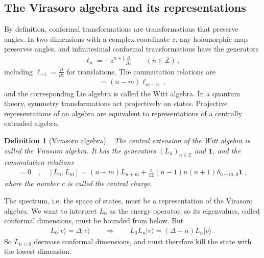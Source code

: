 \documentclass[12pt, a4paper]{article}
\theoremstyle{break}
\newtheorem{defn}[exo]{Definition}
\begin{document}
\subsection{The Virasoro algebra and its representations}

By definition, conformal transformations are transformations that preserve angles. 
In two dimensions with a complex coordinate $z$, any holomorphic map preserves angles, and 
infinitesimal conformal transformations have the generators
\begin{align}
 \ell_n = -z^{n+1}\frac{\partial}{\partial z}\qquad (n\in\mathbb{Z})\ ,
\end{align}
including $\ell_{-1}=\frac{\partial}{\partial z}$ for translations.
The  commutation relations are
\begin{align}
 [\ell_n,\ell_m ] = (n-m)\ell_{m+n}\ ,
\end{align}
and the corresponding Lie algebra is called the Witt algebra.
In a quantum theory, symmetry transformations act projectively on states. 
Projective representations of an algebra are equivalent to representations of a centrally extended algebra. 

\begin{defn}[Virasoro algebra]
 ~\label{def:vir}
 The central extension of the Witt algebra is called the Virasoro algebra. It has the generators $(L_n)_{n\in\mathbb{Z}}$ and $\mathbf 1$, and the commutation relations
 \begin{align}
  [\mathbf 1, L_n] = 0 \quad , \quad [L_n,L_m] = (n-m)L_{n+m} +\frac{c}{12}(n-1)n(n+1)\delta_{n+m,0}\mathbf 1 \ ,
  \label{eq:vir}
 \end{align}
 where the number $c$ is called the central charge. 
\end{defn}

The spectrum, i.e. the space of states, must be a representation of the Virasoro algebra.
We want to interpret $L_0$ as the energy operator, so its eigenvalues, called conformal dimensions, must be bounded from below. But 
\begin{align}
 L_0 |v\rangle = \Delta |v\rangle  \qquad \Rightarrow \qquad L_0 L_n|v\rangle =  (\Delta-n)L_n|v\rangle \ .
\end{align}
So $L_{n>0}$ decrease conformal dimensions, and must therefore kill the state with the lowest dimension. 
\end{document}

